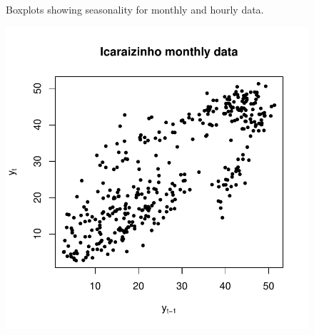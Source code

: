 \begin{figure}
\begin{minipage}[t]{\linewidth}
\begin{minipage}[t]{0.45\linewidth}
      	\label{fig:tubarao-boxplot}
    \end{minipage}
  \end{minipage}
  \caption{Boxplots showing seasonality for monthly and hourly data.}
  \label{fig:boxplots}
\end{figure}



\begin{figure}
  \centering
  \begin{minipage}[t]{\linewidth}
    \centering
    \begin{minipage}[t]{0.45\linewidth}
      \centering     \includegraphics[width=\textwidth]{Figuras/Icaraizinho/scatterplot.pdf}
    \end{minipage}
    \begin{minipage}[t]{0.45\linewidth}

\end{minipage}
\end{minipage}
\end{figure}
